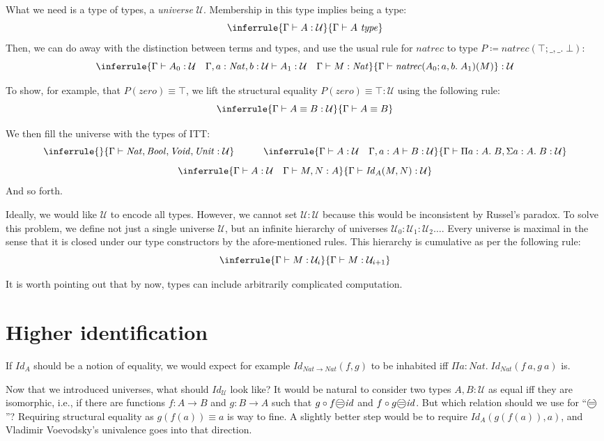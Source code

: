 \documentclass{article} \usepackage{chtt-notes} \usepackage{stmaryrd}
\newcommand{\entails}{\vdash}
\newcommand{\G}{\Gamma}
\newcommand{\atype}[1]{#1~\mathit{type}}
\newcommand{\Nat}{\mathit{Nat}}
\newcommand{\circled}[1]{\text{\textcircled{#1}}}
\begin{document}
What we need is a type of types, a \emph{universe} $\mathcal{U}$.
Membership in this type implies being a type:
\[ \inferrule{\G \entails A : \mathcal{U}}{\G \entails \atype{A}} \]
Then, we can do away with the distinction between terms and types, and use the usual rule for $\mathit{natrec}$ to type $P \coloneqq \mathit{natrec}(\top; \_, \_. \; \bot)$:
\[ \inferrule{\G \entails A_0 : \mathcal{U} \quad \G, a : \Nat, b : \mathcal{U} \entails A_1 : \mathcal{U} \quad \G \entails M : \Nat}{\G \entails \mathit{natrec}(A_0; a, b.\; A_1)(M)} : \mathcal{U} \]

To show, for example, that $P(\mathit{zero}) \equiv \top$, we lift the structural equality $P(\mathit{zero}) \equiv \top : \mathcal{U}$ using the following rule:
\[ \inferrule{\G \entails A \equiv B : \mathcal{U}}{\G \entails A \equiv B} \]

We then fill the universe with the types of ITT:
\[ \inferrule{}{\G \entails \Nat, \mathit{Bool}, \mathit{Void}, \mathit{Unit} : \mathcal{U}} \quad \quad \quad \inferrule{\G \entails A : \mathcal{U} \quad \G, a: A \entails B : \mathcal{U}}{\G \entails \Pi a : A.\; B, \Sigma a : A.\; B : \mathcal{U}}\]
\[ \inferrule{\G \entails A : \mathcal{U} \quad \G \entails M, N : A}{\G \entails \mathit{Id}_A(M, N) : \mathcal{U}} \]
And so forth.

Ideally, we would like $\mathcal{U}$ to encode all types.
However, we cannot set $\mathcal{U} : \mathcal{U}$ because this would be inconsistent by Russel's paradox.
To solve this problem, we define not just a single universe $\mathcal{U}$, but an infinite hierarchy of universes $\mathcal{U}_0: \mathcal{U}_1: \mathcal{U}_2 \dots$.
Every universe is maximal in the sense that it is closed under our type constructors by the afore-mentioned rules.
This hierarchy is cumulative as per the following rule:
\[ \inferrule{\G \entails M : \mathcal{U}_i}{\G \entails M : \mathcal{U}_{i + 1}}\]

It is worth pointing out that by now, types can include arbitrarily complicated computation.

\section{Higher identification}
If $\mathit{Id}_A$ should be a notion of equality, we would expect for example $\mathit{Id}_{\Nat \to \Nat}(f, g)$ to be inhabited iff $\Pi a: \Nat.\; \mathit{Id}_{\Nat}(f~a, g~a)$ is.

Now that we introduced universes, what should $\mathit{Id}_{\mathcal{U}}$ look like?
It would be natural to consider two types $A, B : \mathcal{U}$ as equal iff they are isomorphic, i.e., if there are functions $f : A \to B$ and $g : B \to A$ such that $g \circ f \circled{=} \mathit{id}$ and $f \circ g \circled{=} \mathit{id}$.
But which relation should we use for ``$\circled{=}$''?
Requiring structural equality as $g(f(a)) \equiv a$ is way to fine.
A slightly better step would be to require $\mathit{Id}_A(g(f(a)), a)$, and Vladimir Voevodsky's univalence goes into that direction. \medskip
\end{document}
